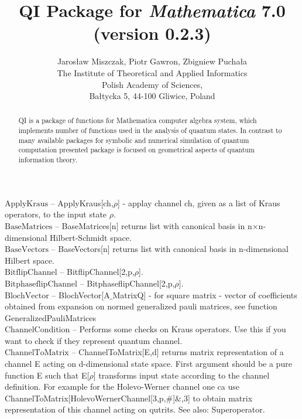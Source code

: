 \documentclass[a4paper,11pt]{article}
\begin{document}
\title{QI Package for \emph{Mathematica} 7.0 (version 0.2.3)}\author{Jaros{\l}aw Miszczak, Piotr Gawron, Zbigniew Pucha{\l}a\\ \small{The Institute of Theoretical and Applied Informatics}\\
\small{Polish Academy of Sciences},\\ \small{Ba{\l}tycka 5, 44-100 Gliwice, Poland}}
\maketitle
\begin{abstract}QI is a package of functions for Mathematica computer algebra system, which implements 
number of functions used in the analysis of quantum states. In contrast to many available 
packages for symbolic and numerical simulation of quantum computation presented package is focused 
on geometrical aspects of quantum information theory.\end{abstract}
\textbf{$ \text{ApplyKraus} $ }-- ApplyKraus[ch,$\rho $] - applay channel ch, given as a list of Kraus operators, to the input state $\rho $.$  $\\

\textbf{$ \text{BaseMatrices} $ }-- BaseMatrices[n] returns list with canonical basis in n$\times $n-dimensional Hilbert-Schmidt space.$  $\\

\textbf{$ \text{BaseVectors} $ }-- BaseVectors[n] returns list with canonical basis in n-dimensional Hilbert space.$  $\\

\textbf{$ \text{BitflipChannel} $ }-- BitflipChannel[2,p,$\rho $].$  $\\

\textbf{$ \text{BitphaseflipChannel} $ }-- BitphaseflipChannel[2,p,$\rho $].$  $\\

\textbf{$ \text{BlochVector} $ }-- BlochVector[A$\_$MatrixQ] - for square matrix - vector of coefficients obtained from expansion on normed generalized pauli matrices, see function GeneralizedPauliMatrices$  $\\

\textbf{$ \text{ChannelCondition} $ }-- Performs some checks on Kraus operators. Use this if you want to check if they represent quantum channel.$  $\\

\textbf{$ \text{ChannelToMatrix} $ }-- ChannelToMatrix[E,d] returns matrix representation of a channel E acting on d-dimensional state space. First argument should be a pure function E such that E[$\rho $] transforms input state according to the channel definition. For example for the Holevo-Werner channel one ca use ChannelToMatrix[HolevoWernerChannel[3,p,$\#$]$\&$,3] to obtain matrix representation of this channel acting on qutrits. See also: Superoperator.$  $\\
\end{document}
